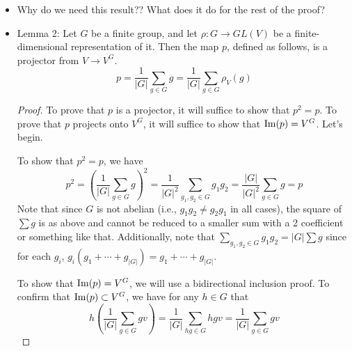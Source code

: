 \documentclass[../notes.tex]{subfiles}
\begin{document}
\begin{itemize}
\begin{proof}
\begin{align*}
            &= \frac{1}{|G|}\sum_{g\in G}[\rho_V(gh)](v)\\
            &= \frac{1}{|G|}\sum_{gh\in G}[\rho_V(gh)](v)\\
            &= \frac{1}{|G|}\sum_{hg\in G}[\rho_V(hg)](v)\\
            &= \frac{1}{|G|}\sum_{g\in G}[\rho_V(hg)](v)\\
            &= [\rho_V(h)]\left( \frac{1}{|G|}\sum_{g\in G}[\rho_V(g)](v) \right)\\
            &= [\rho_V(h)\circ p](v)
        \end{align*}
    \end{proof}
    \item Why do we need this result?? What does it do for the rest of the proof?
    \item Lemma 2: Let $G$ be a finite group, and let $\rho:G\to GL(V)$ be a finite-dimensional representation of it. Then the map $p$, defined as follows, is a projector from $V\to V^G$.
    \begin{equation*}
        p = \frac{1}{|G|}\sum_{g\in G}g = \frac{1}{|G|}\sum_{g\in G}\rho_V(g)
    \end{equation*}
    \begin{proof}
        To prove that $p$ is a projector, it will suffice to show that $p^2=p$. To prove that $p$ projects onto $V^G$, it will suffice to show that $\operatorname{Im}(p)=V^G$. Let's begin.\par
        To show that $p^2=p$, we have
        \begin{equation*}
            p^2 = \left( \frac{1}{|G|}\sum_{g\in G}g \right)^2
            = \frac{1}{|G|^2}\sum_{g_1,g_2\in G}g_1g_2
            = \frac{|G|}{|G|^2}\sum_{g\in G}g
            = p
        \end{equation*}
        Note that since $G$ is not abelian (i.e., $g_1g_2\neq g_2g_1$ in all cases), the square of $\sum g$ is as above and cannot be reduced to a smaller sum with a 2 coefficient or something like that. Additionally, note that $\sum_{g_1,g_2\in G}g_1g_2=|G|\sum g$ since for each $g_i$, $g_i(g_1+\cdots+g_{|G|})=g_1+\cdots+g_{|G|}$.\par
        To show that $\operatorname{Im}(p)=V^G$, we will use a bidirectional inclusion proof. To confirm that $\operatorname{Im}(p)\subset V^G$, we have for any $h\in G$ that
        \begin{equation*}
            h\left( \frac{1}{|G|}\sum_{g\in G}gv \right) = \frac{1}{|G|}\sum_{hg\in G}hgv
            = \frac{1}{|G|}\sum_{g\in G}gv
        \end{equation*}

\end{proof}
\end{itemize}
\end{document}
